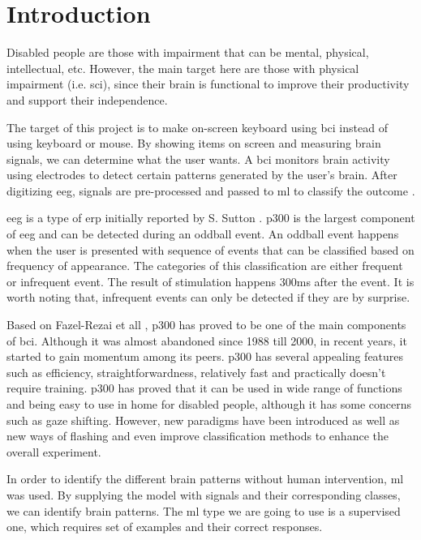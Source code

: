 \chapter{Introduction}
\label{chap:introduction}
Disabled people are those with impairment that can be mental, physical, intellectual, etc. However, the main target here are those with physical impairment (i.e. \ac{sci}), since their brain is functional to improve their productivity and support their independence.\par
The target of this project is to make on-screen keyboard using \ac{bci} instead of using keyboard or mouse. By showing items on screen and measuring brain signals, we can determine what the user wants. A \ac{bci} monitors brain activity using electrodes to detect certain patterns generated by the user's brain. After digitizing \ac{eeg}, signals are pre-processed and passed to \ac{ml} to classify the outcome \cite{article1, inproceedings1, article2, inproceedings2}.\par
\ac{eeg} is a type of \ac{erp} initially reported by S. Sutton \cite{article5}. \ac{p300} is the largest component of \ac{eeg} and can be detected during an oddball event. An oddball event happens when the user is presented with sequence of events that can be classified based on frequency of appearance. The categories of this classification are either frequent or infrequent event. The result of stimulation happens 300ms after the event. It is worth noting that, infrequent events can only be detected if they are by surprise.\par
Based on Fazel-Rezai et all \cite{article6}, \ac{p300} has proved to be one of the main components of \ac{bci}. Although it was almost abandoned since 1988 till 2000, in recent years, it started to gain momentum among its peers. \ac{p300} has several appealing features such as efficiency, straightforwardness, relatively fast and practically doesn't require training. \ac{p300} has proved that it can be used in wide range of functions and being easy to use in home for disabled people, although it has some concerns such as gaze shifting. However, new paradigms have been introduced as well as new ways of flashing and even improve classification methods \cite{inproceedings1} to enhance the overall experiment.\par
In order to identify the different brain patterns without human intervention, \ac{ml} was used. By supplying the model with signals and their corresponding classes, we can identify brain patterns. The \ac{ml} type we are going to use is a supervised one, which requires set of examples and their correct responses.
\clearpage
